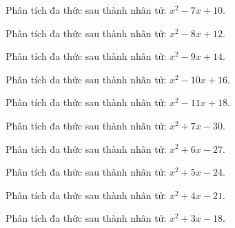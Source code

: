 \begin{bt}
	Phân tích đa thức sau thành nhân tử: $x^2 - 7 x + 10$.
\end{bt}
\begin{bt}
	Phân tích đa thức sau thành nhân tử: $x^2 - 8 x + 12$.
\end{bt}
\begin{bt}
	Phân tích đa thức sau thành nhân tử: $x^2 - 9 x + 14$.
\end{bt}
\begin{bt}
	Phân tích đa thức sau thành nhân tử: $x^2 - 10 x + 16$.
\end{bt}
\begin{bt}
	Phân tích đa thức sau thành nhân tử: $x^2 - 11 x + 18$.
\end{bt}
\begin{bt}
	Phân tích đa thức sau thành nhân tử: $x^2 + 7 x - 30$.
\end{bt}
\begin{bt}
	Phân tích đa thức sau thành nhân tử: $x^2 + 6 x - 27$.
\end{bt}
\begin{bt}
	Phân tích đa thức sau thành nhân tử: $x^2 + 5 x - 24$.
\end{bt}
\begin{bt}
	Phân tích đa thức sau thành nhân tử: $x^2 + 4 x - 21$.
\end{bt}
\begin{bt}
	Phân tích đa thức sau thành nhân tử: $x^2 + 3 x - 18$.
\end{bt}
